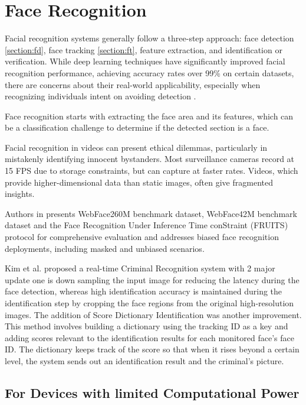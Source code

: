 \section{Face Recognition} \label{section:fr}
Facial recognition systems generally follow a three-step approach: face detection \ref{section:fd}, face tracking \ref{section:ft}, feature extraction, and identification or verification. While deep learning techniques have significantly improved facial recognition performance, achieving accuracy rates over 99\% on certain datasets, there are concerns about their real-world applicability, especially when recognizing individuals intent on avoiding detection \cite{kim_surveillance_2023}.

Face recognition starts with extracting the face area and its features, which can be a classification challenge to determine if the detected section is a face.

Facial recognition in videos can present ethical dilemmas, particularly in mistakenly identifying innocent bystanders. Most surveillance cameras record at 15 FPS due to storage constraints, but can capture at faster rates. Videos, which provide higher-dimensional data than static images, often give fragmented insights.

Authors in \cite{zhu_webface260m_2023} presents WebFace260M benchmark dataset, WebFace42M benchmark dataset and the Face Recognition Under Inference Time conStraint (FRUITS) protocol for comprehensive evaluation and addresses biased face recognition deployments, including masked and unbiased scenarios. 

Kim et al. \cite{kim_facial_2023} proposed a real-time Criminal Recognition system with 2 major update one is down sampling the input image for reducing the latency during the face detection, whereas high identification accuracy is maintained during the identification step by cropping the face regions from the original high-resolution images. The addition of Score Dictionary Identification was another improvement. This method involves building a dictionary using the tracking ID as a key and adding scores relevant to the identification results for each monitored face's face ID. The dictionary keeps track of the score so that when it rises beyond a certain level, the system sends out an identification result and the criminal's picture.

\subsection{For Devices with limited Computational Power}

